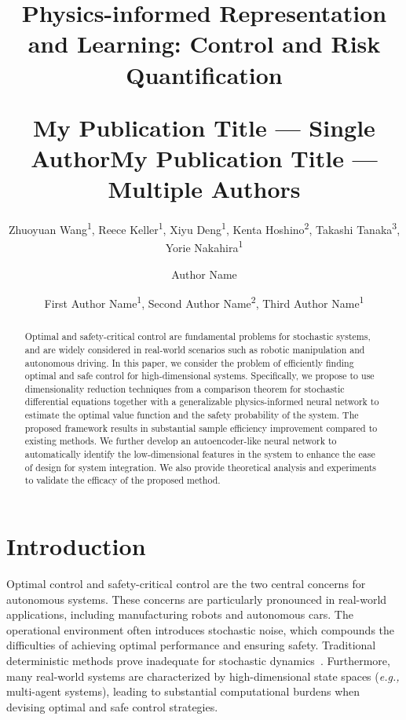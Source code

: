 \documentclass[letterpaper]{article} %
\title{



Physics-informed Representation and Learning: Control and Risk Quantification
}
\author{
    Zhuoyuan Wang\textsuperscript{\rm 1},
    Reece Keller\textsuperscript{\rm 1},
    Xiyu Deng\textsuperscript{\rm 1}, Kenta Hoshino\textsuperscript{\rm 2}, Takashi Tanaka\textsuperscript{\rm 3}, Yorie Nakahira\textsuperscript{\rm 1}
}
\title{My Publication Title --- Single Author}
\author {
    Author Name
}
\title{My Publication Title --- Multiple Authors}
\author {
    First Author Name\textsuperscript{\rm 1},
    Second Author Name\textsuperscript{\rm 2},
    Third Author Name\textsuperscript{\rm 1}
}
\newcommand{\eg}{\textit{e.g., }}
\begin{document}
\maketitle

\begin{abstract}
Optimal and safety-critical control are fundamental problems for stochastic systems, and are widely considered in real-world scenarios such as robotic manipulation and autonomous driving. In this paper, we consider the problem of efficiently finding optimal and safe control for high-dimensional systems. Specifically, we propose to use dimensionality reduction techniques from a comparison theorem for stochastic differential equations together with a generalizable physics-informed neural network to estimate the optimal value function and the safety probability of the system. The proposed framework results in substantial sample efficiency improvement compared to existing methods. We further develop an autoencoder-like neural network to automatically identify the low-dimensional features in the system to enhance the ease of design for system integration. We also provide theoretical analysis and experiments to validate the efficacy of the proposed method. 

\end{abstract}

\section{Introduction}

Optimal control and safety-critical control are the two central concerns for autonomous systems.
These concerns are particularly pronounced in real-world applications, including manufacturing robots and autonomous cars.
The operational environment often introduces stochastic noise, which compounds the difficulties of achieving optimal performance and ensuring safety. Traditional deterministic methods prove inadequate for stochastic dynamics~\cite{katsoulakis2020data}.
Furthermore, many real-world systems are characterized by high-dimensional state spaces (\eg multi-agent systems), leading to substantial computational burdens when devising optimal and safe control strategies. 

\end{document}
